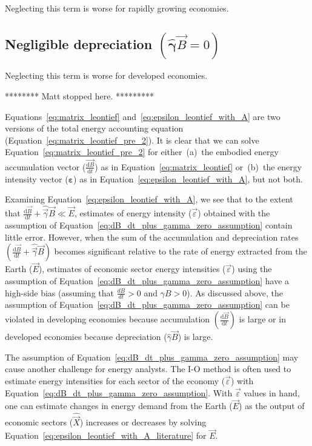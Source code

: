 Neglecting this term is worse for rapidly growing economies.



\subsection{Negligible depreciation $\left( \hat{\bm{\gamma}}\vec{B} = 0 \right)$}

Neglecting this term is worse for developed economies.






******** Matt stopped here. *********

Equations~\ref{eq:matrix_leontief} and~\ref{eq:epsilon_leontief_with_A}
are two versions of the total energy 
accounting equation (Equation~\ref{eq:matrix_leontief_pre_2}).
It is clear that we can solve Equation~\ref{eq:matrix_leontief_pre_2} 
for either~(a)~the embodied energy accumulation
vector ($\vec{\frac{\mathrm{d}B}{\mathrm{d}t}}$) 
as in Equation~\ref{eq:matrix_leontief} 
or~(b)~the energy intensity vector ($\bm{\varepsilon}$) as in
Equation~\ref{eq:epsilon_leontief_with_A}, 
but not both.




Examining Equation~\ref{eq:epsilon_leontief_with_A}, 
we see that to the extent that 
$\frac{\mathrm{d}\vec{B}}{\mathrm{d}t} + \hat{\vec{\gamma}}\vec{B} \ll \vec{E}$, 
estimates of energy intensity ($\vec{\varepsilon}$) 
obtained with the assumption of Equation~\ref{eq:dB_dt_plus_gamma_zero_assumption} 
contain little error. 
However, when the sum of the accumulation and depreciation rates 
$\left(\frac{\mathrm{d}\vec{B}}{\mathrm{d}t} + \hat{\vec{\gamma}}\vec{B}\right)$ 
becomes significant relative to the rate of energy extracted 
from the Earth ($\vec{E}$), 
estimates of economic sector energy intensities ($\vec{\varepsilon}$) 
using the assumption of Equation~\ref{eq:dB_dt_plus_gamma_zero_assumption} 
have a high-side bias (assuming that $\frac{dB}{dt} >0$ and $\gamma B > 0$). 
As discussed above, the assumption of Equation~\ref{eq:dB_dt_plus_gamma_zero_assumption} 
can be violated in developing economies 
because accumulation $\left(\frac{\mathrm{d}\vec{B}}{\mathrm{d}t}\right)$ 
is large or in developed economies because depreciation ($\hat{\gamma}\vec{B}$) is large. 

The assumption of Equation~\ref{eq:dB_dt_plus_gamma_zero_assumption} 
may cause another challenge for energy analysts. 
The I-O method is often used to estimate energy intensities 
for each sector of the economy ($\vec{\varepsilon}$) 
with Equation~\ref{eq:dB_dt_plus_gamma_zero_assumption}. 
With $\vec{\varepsilon}$ values in hand, 
one can estimate changes in energy demand from the Earth ($\vec{E}$) 
as the output of economic sectors ($\hat{\vec{X}}$) 
increases or decreases by solving 
Equation~\ref{eq:epsilon_leontief_with_A_literature} for $\vec{E}$.

